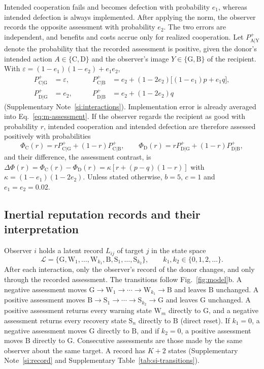 \documentclass[fleqn,10pt]{wlscirep}
\newcommand{\Lspace}{\mathscr{L}}          %
\newcommand{\st}[1]{\mathrm{#1}}           %
\newcommand{\Pp}[1]{P^{+}_{\mathrm{#1}}}   %
\newcommand{\PhiC}{\Phi_{\mathrm{C}}}
\newcommand{\PhiD}{\Phi_{\mathrm{D}}}
\theoremstyle{plain}
\begin{document}
Intended cooperation fails and becomes defection with probability $e_1$, whereas intended defection is always implemented. After applying the norm, the observer records the opposite assessment with probability $e_2$. The two errors are independent, and benefits and costs accrue only for realized cooperation. Let $\Pp{A|Y}$ denote the probability that the recorded assessment is positive, given the donor's intended action $A\in\{\st C,\st D\}$ and the observer's image $Y\in\{\st G,\st B\}$ of the recipient. With $\varepsilon=(1-e_1)(1-e_2)+e_1e_2$,
\begin{equation}
\begin{aligned}
\Pp{C|G}&=\varepsilon, &\qquad \Pp{C|B}&=e_2+(1-2e_2)\bigl[(1-e_1)p+e_1q\bigr],\\
\Pp{D|G}&=e_2, &\qquad \Pp{D|B}&=e_2+(1-2e_2)q
\end{aligned}
\label{eq:m-assessment}
\end{equation}
(Supplementary Note~\ref{si:interactions}). Implementation error is already averaged into Eq.~\eqref{eq:m-assessment}. If the observer regards the recipient as good with probability $r$, intended cooperation and intended defection are therefore assessed positively with probabilities
\begin{equation}
\PhiC(r)=r\Pp{C|G}+(1-r)\Pp{C|B},\qquad
\PhiD(r)=r\Pp{D|G}+(1-r)\Pp{D|B},
\label{eq:m-phi}
\end{equation}
and their difference, the assessment contrast, is $\Delta\Phi(r)=\PhiC(r)-\PhiD(r)=\kappa[r+(p-q)(1-r)]$ with $\kappa=(1-e_1)(1-2e_2)$. Unless stated otherwise, $b=5$, $c=1$ and $e_1=e_2=0.02$.

\subsection*{Inertial reputation records and their interpretation}

Observer $i$ holds a latent record $L_{ij}$ of target $j$ in the state space
\begin{equation}
\Lspace=\{\st G,\st W_1,\ldots,\st W_{k_1},\st B,\st S_1,\ldots,\st S_{k_2}\},\qquad k_1,k_2\in\{0,1,2,\ldots\}.
\label{eq:m-states}
\end{equation}
After each interaction, only the observer's record of the donor changes, and only through the recorded assessment. The transitions follow Fig.~\ref{fig:model}b. A negative assessment moves $\st G\to\st W_1\to\cdots\to\st W_{k_1}\to\st B$ and leaves $\st B$ unchanged. A positive assessment moves $\st B\to\st S_1\to\cdots\to\st S_{k_2}\to\st G$ and leaves $\st G$ unchanged. A positive assessment returns every warning state $\st W_m$ directly to $\st G$, and a negative assessment returns every recovery state $\st S_n$ directly to $\st B$ (direct reset). If $k_1=0$, a negative assessment moves $\st G$ directly to $\st B$, and if $k_2=0$, a positive assessment moves $\st B$ directly to $\st G$. Consecutive assessments are those made by the same observer about the same target. A record has $K+2$ states (Supplementary Note~\ref{si:record} and Supplementary Table~\ref{tab:si-transitions}).
\end{document}

